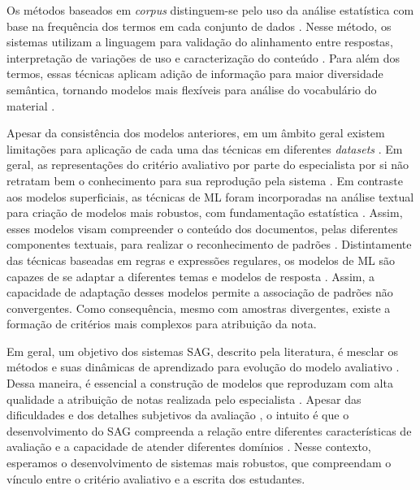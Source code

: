 Os métodos baseados em \textit{corpus} distinguem-se pelo uso da análise estatística com base na frequência dos termos em cada conjunto de dados \cite{kumar2019}. Nesse método, os sistemas utilizam a linguagem para validação do alinhamento entre respostas, interpretação de variações de uso e caracterização do conteúdo \cite{ziai2012, menini2019}. Para além dos termos, essas técnicas aplicam adição de informação para maior diversidade semântica, tornando modelos mais flexíveis para análise do vocabulário do material \cite{fowler2021}.

Apesar da consistência dos modelos anteriores, em um âmbito geral existem limitações para aplicação de cada uma das técnicas em diferentes \textit{datasets} \cite{riordan2019, ding2020}. Em geral, as representações do critério avaliativo por parte do especialista por si não retratam bem o conhecimento para sua reprodução pela sistema \cite{filighera2020}. Em contraste aos modelos superficiais, as técnicas de ML foram incorporadas na análise textual para criação de modelos mais robustos, com fundamentação estatística \cite{galhardi2018b}. Assim, esses modelos visam compreender o conteúdo dos documentos, pelas diferentes componentes textuais, para realizar o reconhecimento de padrões \cite{suzen2020}. Distintamente das técnicas baseadas em regras e expressões regulares, os modelos de ML são capazes de se adaptar a diferentes temas e modelos de resposta \cite{zhang2016, saha2019, camus2020}. Assim, a capacidade de adaptação desses modelos permite a associação de padrões não convergentes. Como consequência, mesmo com amostras divergentes, existe a formação de critérios mais complexos para atribuição da nota.

Em geral, um objetivo dos sistemas SAG, descrito pela literatura, é mesclar os métodos e suas dinâmicas de aprendizado para evolução do modelo avaliativo \cite{burrows2015, zesch2018}. Dessa maneira, é essencial a construção de modelos que reproduzam com alta qualidade a atribuição de notas realizada pelo especialista \cite{jordan2012}. Apesar das dificuldades e dos detalhes subjetivos da avaliação \cite{roy2018}, o intuito é que o desenvolvimento do SAG compreenda a relação entre diferentes características de avaliação e a capacidade de atender diferentes domínios \cite{sung2019a, saha2019}. Nesse contexto, esperamos o desenvolvimento de sistemas mais robustos, que compreendam o vínculo entre o critério avaliativo e a escrita dos estudantes.
